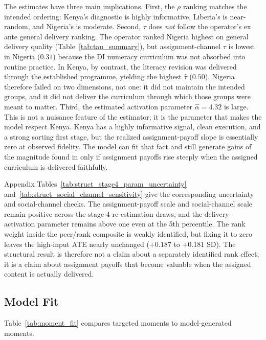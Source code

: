 \documentclass[11pt]{article}
\begin{document}
The estimates have three main implications. First, the $\rho$ ranking matches the intended ordering: Kenya's diagnostic is highly informative, Liberia's is near-random, and Nigeria's is moderate. Second, $\tau$ does \emph{not} follow the operator's ex ante general delivery ranking. The operator ranked Nigeria highest on general delivery quality (Table~\ref{tab:tau_summary}), but assignment-channel $\tau$ is lowest in Nigeria ($0.31$) because the DI numeracy curriculum was not absorbed into routine practice. In Kenya, by contrast, the literacy revision was delivered through the established programme, yielding the highest $\hat{\tau}$ ($0.50$). Nigeria therefore failed on two dimensions, not one: it did not maintain the intended groups, and it did not deliver the curriculum through which those groups were meant to matter. Third, the estimated activation parameter $\hat{\alpha}=4.32$ is large. This is not a nuisance feature of the estimator; it is the parameter that makes the model respect Kenya. Kenya has a highly informative signal, clean execution, and a strong sorting first stage, but the realized assignment-payoff slope is essentially zero at observed fidelity. The model can fit that fact and still generate gains of the magnitude found in \citet{duflo2011peer} only if assignment payoffs rise steeply when the assigned curriculum is delivered faithfully.

Appendix Tables~\ref{tab:struct_stage4_param_uncertainty} and~\ref{tab:struct_social_channel_sensitivity} give the corresponding uncertainty and social-channel checks. The assignment-payoff scale and social-channel scale remain positive across the stage-4 re-estimation draws, and the delivery-activation parameter remains above one even at the 5th percentile. The rank weight inside the peer/rank composite is weakly identified, but fixing it to zero leaves the high-input ATE nearly unchanged ($+0.187$ to $+0.181$ SD). The structural result is therefore not a claim about a separately identified rank effect; it is a claim about assignment payoffs that become valuable when the assigned content is actually delivered.

\subsection{Model Fit}
\label{subsec:struct_fit}

Table~\ref{tab:moment_fit} compares targeted moments to model-generated moments.


\end{document}
